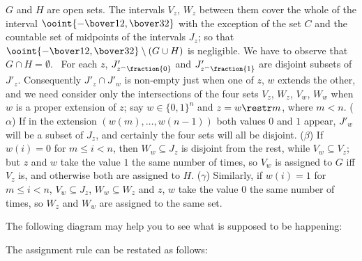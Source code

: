 {

\noindent $G$ and $H$ are open sets.   The intervals $V_z$, $W_z$
between them cover the whole of the interval
$\ooint{-\bover12,\bover32}$ with the exception of the set $C$ and the
countable set of midpoints of the intervals $J_z$;  so that
$\ooint{-\bover12,\bover32}\setminus(G\cup H)$ is negligible.   We have
to observe that $G\cap H=\emptyset$.   \Prf\ For each $z$,
$J'_{z^{\smallfrown}\fraction{0}}$ and $J'_{z^{\smallfrown}\fraction{1}}$ are disjoint subsets
of $J'_z$.   Consequently $J'_z\cap J'_{w}$ is non-empty just when one
of $z$, $w$ extends the other, and we need consider only the
intersections of the four sets $V_z$, $W_z$, $V_{w}$, $W_{w}$ when
$w$ is a proper extension of $z$;  say $w\in\{0,1\}^n$ and $z= w\restr
m$, where $m<n$.  ($\alpha$)
If in the extension $(w(m),\ldots,w(n-1))$ both values $0$ and $1$
appear, $J'_{w}$ will be a subset of $J_z$, and certainly the four sets
will all be disjoint.   ($\beta$) If $w(i)=0$ for $m\le i<n$, then
$W_{w}\subseteq J_z$ is disjoint from the rest, while $V_{w}\subseteq
V_z$;  but $z$ and $w$ take the value $1$ the same number of times, so
$V_{w}$ is assigned to $G$ iff $V_z$ is, and otherwise both are
assigned to $H$.   ($\gamma$) Similarly, if $w(i)=1$ for $m\le i<n$,
$V_{w}\subseteq J_z$, $W_{w}\subseteq W_z$ and $z$, $w$ take the
value $0$ the same number of times, so $W_z$ and $W_{w}$ are assigned
to the same set.\ \Qed

The following diagram may help you to see what is supposed to be
happening:

\def\Caption{}
\ifdim\pagewidth>467pt\picture{mt345f}{125pt}
\else\picture{mt345f}{104pt}\fi

\noindent The assignment rule can be restated as follows:


\medskip

}
